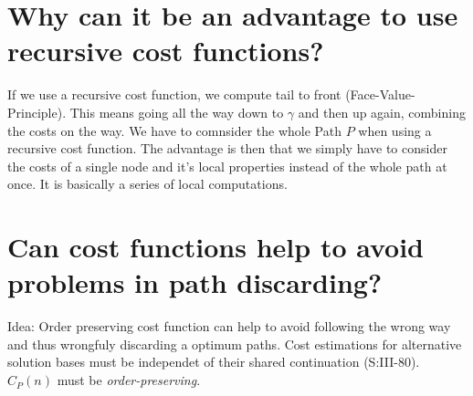 \documentclass[12pt, a4paper]{article}
\begin{document}
\section{Why can it be an advantage to use recursive cost functions?}
If we use a recursive cost function, we compute tail to front (Face-Value-Principle). This means going all the way down to $\gamma$ and then up again, combining the costs on the way. We have to comnsider the whole Path $P$ when using a recursive cost function. The advantage is then that we simply have to consider the costs of a single node and it's local properties instead of the whole path at once. It is basically a series of local computations.

\section{Can cost functions help to avoid problems in path discarding?}
Idea: Order preserving cost function can help to avoid following the wrong way and thus wrongfuly discarding a optimum paths.
Cost estimations for alternative solution bases must be independet of their shared continuation (S:III-80). $\hat{C}_P(n)$ must be \textit{order-preserving}.
\end{document}
